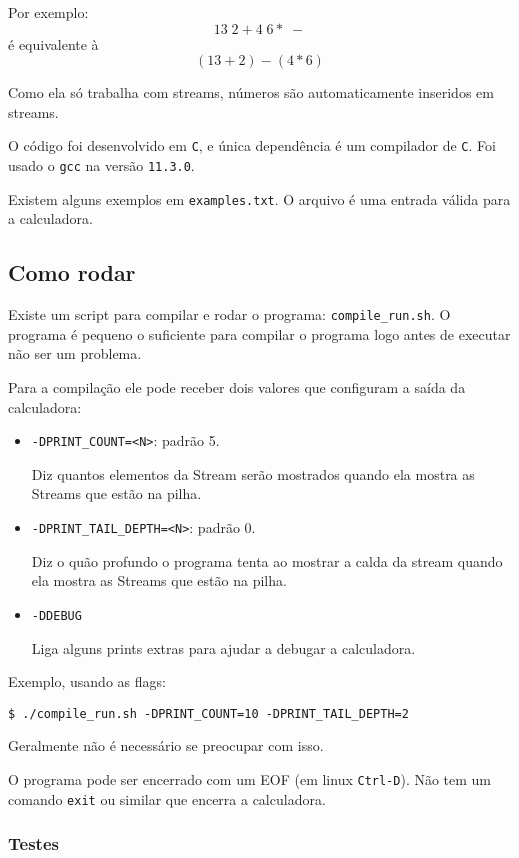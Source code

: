 \documentclass{article}
\begin{document}
Por exemplo:
\[
    13 \; 2 + 4 \; 6 * \; -
\]
é equivalente à
\[
    (13 + 2) - (4 * 6)
\]

Como ela só trabalha com streams,
números são automaticamente inseridos em streams.

O código foi desenvolvido em \texttt{C},
e única dependência é um compilador de \texttt{C}.
Foi usado o \texttt{gcc} na versão \texttt{11.3.0}.

Existem alguns exemplos em \texttt{examples.txt}.
O arquivo é uma entrada válida para a calculadora.

\subsection{Como rodar}

Existe um script para compilar e rodar o programa:
\texttt{compile\_run.sh}.
O programa é pequeno o suficiente para
compilar o programa logo antes de executar
não ser um problema.

Para a compilação ele pode receber dois valores
que configuram a saída da calculadora:
\begin{itemize}
    \item \texttt{-DPRINT\_COUNT=<N>}: padrão 5. \par
    Diz quantos elementos da Stream serão mostrados
    quando ela mostra as Streams que estão na pilha.
    \item \texttt{-DPRINT\_TAIL\_DEPTH=<N>}: padrão 0. \par
    Diz o quão profundo o programa tenta ao mostrar a calda da stream
    quando ela mostra as Streams que estão na pilha.
    \item \texttt{-DDEBUG}\par
    Liga alguns prints extras para ajudar a debugar a calculadora.
\end{itemize}

Exemplo, usando as flags:
\begin{verbatim}
$ ./compile_run.sh -DPRINT_COUNT=10 -DPRINT_TAIL_DEPTH=2
\end{verbatim}

Geralmente não é necessário se preocupar com isso.

O programa pode ser encerrado com um EOF
(em linux \texttt{Ctrl-D}).
Não tem um comando \texttt{exit} ou similar que encerra a calculadora.

\subsubsection{Testes}
\end{document}
